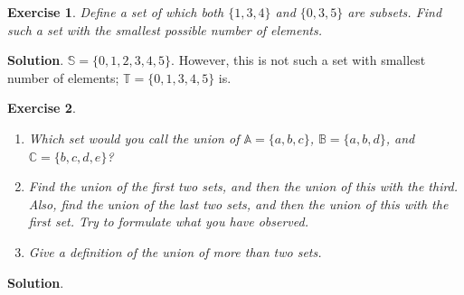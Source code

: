 \documentclass[11pt]{book}
\theoremstyle{definition}
\theoremstyle{plain}
\newtheorem{exercise}{Exercise}
\theoremstyle{definition}
\theoremstyle{problemstyle}
\theoremstyle{remark}
\theoremstyle{definition}
\begin{document}
\begin{exercise}
    Define a set of which both $\{1,3,4\}$ and $\{0,3,5\}$ are subsets. Find such a set with the smallest possible number of elements.
    \label{ex:1.2.9}
\end{exercise}
\textbf{Solution}. 
$\mathbb{S}=\{0,1,2,3,4,5\}$. However, this is not such a set with smallest number of elements; $\mathbb{T}=\{0,1,3,4,5\}$ is. 
\begin{exercise}
    \begin{enumerate}[label={(\alph*)}]
        \item Which set would you call the union of $\mathbb{A}=\{a,b,c\}$, $\mathbb{B}=\{a,b,d\}$, and $\mathbb{C}=\{b, c, d, e\}$?
        \item Find the union of the first two sets, and then the union of this with the third. Also, find the union of the last two sets, and then the union of this with the first set. Try to formulate what you have observed.
        \item Give a definition of the union of more than two sets.
    \end{enumerate}
    \label{ex:1.2.10}
\end{exercise}
\textbf{Solution}. 
\end{document}
